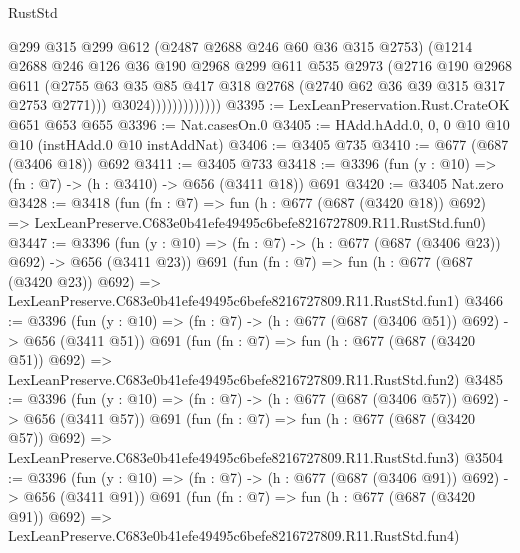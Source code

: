 \begin{lexlean}{RustStd}
\begin{coremodule}
                            @299
                            @315
                            @299
                            @612
                            (@2487 @2688 @246 @60 @36 @315 @2753)
                            (@1214
                              @2688
                              @246
                              @126
                              @36
                              @190
                              @2968
                              @299
                              @611
                              @535
                              @2973
                              (@2716
                                @190
                                @2968
                                @611
                                (@2755
                                  @63
                                  @35
                                  @85
                                  @417
                                  @318
                                  @2768
                                  (@2740 @62 @36 @39 @315 @317 @2753 @2771)))
                              @3024)))))))))))))
@3395 := LexLeanPreservation.Rust.CrateOK @651 @653 @655
@3396 := Nat.casesOn.{0}
@3405 := HAdd.hAdd.{0, 0, 0} @10 @10 @10 (instHAdd.{0} @10 instAddNat)
@3406 := @3405 @735
@3410 := @677 (@687 (@3406 @18)) @692
@3411 := @3405 @733
@3418 := @3396 (fun (y : @10) => (fn : @7) -> (h : @3410) -> @656 (@3411 @18)) @691
@3420 := @3405 Nat.zero
@3428 := @3418
    (fun (fn : @7) =>
    fun (h : @677 (@687 (@3420 @18)) @692) =>
    LexLeanPreserve.C683e0b41efe49495c6befe8216727809.R11.RustStd.fun0)
@3447 := @3396
    (fun (y : @10) => (fn : @7) -> (h : @677 (@687 (@3406 @23)) @692) -> @656 (@3411 @23))
    @691
    (fun (fn : @7) =>
    fun (h : @677 (@687 (@3420 @23)) @692) =>
    LexLeanPreserve.C683e0b41efe49495c6befe8216727809.R11.RustStd.fun1)
@3466 := @3396
    (fun (y : @10) => (fn : @7) -> (h : @677 (@687 (@3406 @51)) @692) -> @656 (@3411 @51))
    @691
    (fun (fn : @7) =>
    fun (h : @677 (@687 (@3420 @51)) @692) =>
    LexLeanPreserve.C683e0b41efe49495c6befe8216727809.R11.RustStd.fun2)
@3485 := @3396
    (fun (y : @10) => (fn : @7) -> (h : @677 (@687 (@3406 @57)) @692) -> @656 (@3411 @57))
    @691
    (fun (fn : @7) =>
    fun (h : @677 (@687 (@3420 @57)) @692) =>
    LexLeanPreserve.C683e0b41efe49495c6befe8216727809.R11.RustStd.fun3)
@3504 := @3396
    (fun (y : @10) => (fn : @7) -> (h : @677 (@687 (@3406 @91)) @692) -> @656 (@3411 @91))
    @691
    (fun (fn : @7) =>
    fun (h : @677 (@687 (@3420 @91)) @692) =>
    LexLeanPreserve.C683e0b41efe49495c6befe8216727809.R11.RustStd.fun4)

\end{coremodule}
\end{lexlean}
